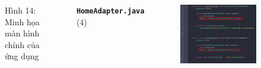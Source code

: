 \documentclass{beamer}
\begin{document}
\begin{frame}
\begin{columns}
\begin{figure}
            \caption{\centering\tiny{Hình 14: Minh họa màn hình chính của ứng dụng}}
        \end{figure}
        \indent \textbf{\texttt{HomeAdapter.java}} (4)
        \begin{figure}
            \centering
            \includegraphics[width=\textwidth]{images/21.png}
        \end{figure}
    \end{columns}
\end{frame}
\end{document}
